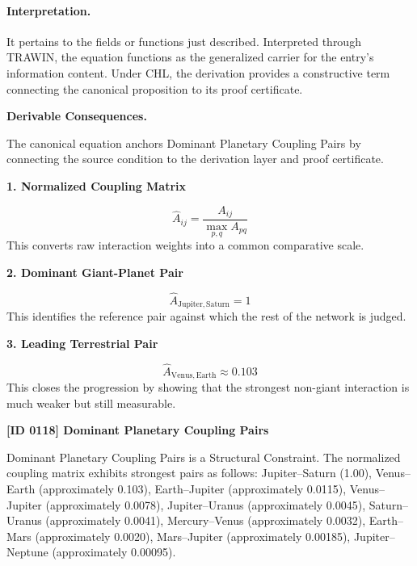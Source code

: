 \paragraph{Interpretation.}
It pertains to the fields or functions just described. Interpreted through TRAWIN, the equation functions as the generalized carrier for the entry’s information content. Under CHL, the derivation provides a constructive term connecting the canonical proposition to its proof certificate.

\par\vspace{0.35em}
\noindent\textbf{Derivable Consequences.}\quad
\begingroup
\footnotesize
\raggedright
The canonical equation anchors Dominant Planetary Coupling Pairs by connecting the source condition to the derivation layer and proof certificate.
\par\endgroup

\noindent\textbf{1. Normalized Coupling Matrix}\par
\[
\widehat{A}_{ij}=\frac{A_{ij}}{\max_{p,q}A_{pq}}
\]
\noindent This converts raw interaction weights into a common comparative scale.\par
\noindent\textbf{2. Dominant Giant-Planet Pair}\par
\[
\widehat{A}_{\mathrm{Jupiter,Saturn}} = 1
\]
\noindent This identifies the reference pair against which the rest of the network is judged.\par
\noindent\textbf{3. Leading Terrestrial Pair}\par
\[
\widehat{A}_{\mathrm{Venus,Earth}} \approx 0.103
\]
\noindent This closes the progression by showing that the strongest non-giant interaction is much weaker but still measurable.\par

\clearpage
\noindent\textbf{[ID 0118] Dominant Planetary Coupling Pairs}\par
\vspace{0.35em}
\begingroup\small
{}
Dominant Planetary Coupling Pairs is a Structural Constraint. The normalized coupling matrix exhibits strongest pairs as follows: Jupiter--Saturn (1.00), Venus--Earth (approximately 0.103), Earth--Jupiter (approximately 0.0115), Venus--Jupiter (approximately 0.0078), Jupiter--Uranus (approximately 0.0045), Saturn--Uranus (approximately 0.0041), Mercury--Venus (approximately 0.0032), Earth--Mars (approximately 0.0020), Mars--Jupiter (approximately 0.00185), Jupiter--Neptune (approximately 0.00095).

